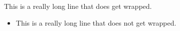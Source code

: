 \documentclass{article}
\begin{document}
This is a really long line that does
get wrapped.
\begin{itemize}
	\item This is a really long line
	      that does not get wrapped.
\end{itemize}
\end{document}
